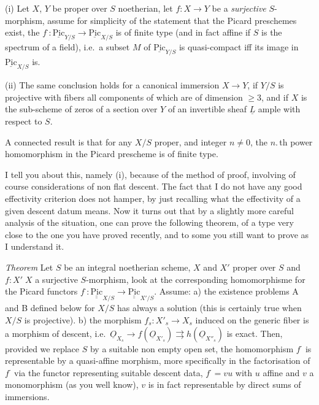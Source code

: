 \documentclass[11pt,a4paper]{article}
\begin{document}
(i) Let $X$, $Y$ be proper over $S$ noetherian, let $f\colon X \to Y$ be a \emph{surjective} $S$-morphism, assume for simplicity of the statement that the Picard preschemes exist, the $f^{\cdot}\colon \underline{\mathrm{Pic}}_{Y/S} \to \underline{\mathrm{Pic}}_{X/S}$ is of finite type (and in fact affine if $S$ is the spectrum of a field), i.e.\ a subset $M$ of $\underline{\mathrm{Pic}}_{Y/S}$ is quasi-compact iff its image in $\underline{\mathrm{Pic}}_{X/S}$ is.

(ii) The same conclusion holds for a canonical immersion $X \to Y$, if $Y/S$ is projective with fibers all components of which are of dimension $\geqslant 3$, and if $X$ is the sub-scheme of zeros of a section over $Y$ of an invertible sheaf $\underline{L}$ ample with respect to $S$.

A connected result is that for any $X/S$ proper, and integer $n \neq 0$, the $n$.\,th power homomorphism in the Picard prescheme is of finite type.

I tell you about this, namely (i), because of the method of proof, involving of course considerations of non flat descent. The fact that I do not have any good effectivity criterion does not hamper, by just recalling what the effectivity of a given descent datum means. Now it turns out that by a slightly more careful analysis of the situation, one can prove the following theorem, of a type very close to the one you have proved recently, and to some you still want to prove as I understand it.

\emph{Theorem} Let $S$ be an integral noetherian scheme, $X$ and $X'$ proper over $S$ and $f\colon X' \;X$ a surjective $S$-morphism, look at the corresponding homomorphisme for the Picard functors $f^{\cdot}\colon \underline{\underline{\mathrm{Pic}}}_{X/S} \to \underline{\underline{\mathrm{Pic}}}_{X'/S}$. Assume: a) the existence problems A and B defined below for $X/S$ has always a solution (this is certainly true when $X/S$ is projective). b) the morphism $f_s\colon X'_s \to X_s$ induced on the generic fiber is a morphism of descent, i.e.\ $\underline{O}_{X_s} \to f(\underline{O}_{X'_s}) \rightrightarrows h(\underline{O}_{X''_s})$ is exact. Then, provided we replace $S$ by a suitable non empty open set, the homomorphism $f^{\cdot}$ is representable by a quasi-affine morphism, more specifically in the factorisation of $f^{\cdot}$ via the functor representing suitable descent data, $f^{\cdot} = vu$ with $u$ affine and $v$ a monomorphism (as you well know), $v$ is in fact representable by  direct sums of immersions.
\end{document}
